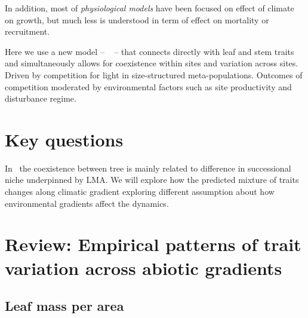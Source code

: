 \documentclass[a4paper,11pt]{article}
\begin{document}
In addition, most of \textit{physiological models} have been focused on effect of climate on growth, but much less is understood in term of effect on mortality or recruitment.

Here we use a new model -- \plant\ \citep{Falster-2016} -- that connects directly with leaf and stem traits and simultaneously allows for coexistence within sites and variation across sites.  Driven by competition for light in size-structured meta-populations. Outcomes of competition moderated by environmental factors such as site productivity and disturbance regime.


\section{Key questions}

In \plant\ the coexistence between tree is mainly related to difference in successional niche underpinned by LMA. We will explore how the predicted mixture of traits changes along climatic gradient exploring different assumption about how environmental gradients
affect the dynamics.

\section{Review: Empirical patterns of trait variation across abiotic
gradients}


\subsection{Leaf mass per area}
\end{document}
